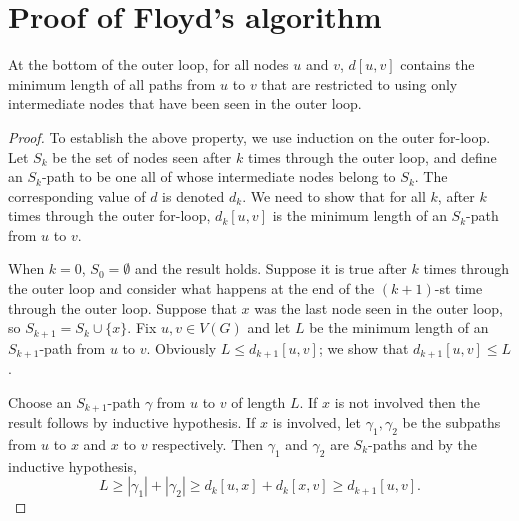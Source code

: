 \section{Proof of Floyd's algorithm}
\begin{Theorem} \label{thm:floyd}
At the bottom of the outer  loop, for all nodes $u$ and $v$,
$d[u,v]$ contains the minimum length of all paths from $u$ to $v$ that
are restricted to using only intermediate nodes that have been seen in
the outer  loop. 
\end{Theorem}


\begin{proof}
To establish the above property, we use induction on the outer for-loop.
Let $S_k$ be the set of nodes seen after $k$ times through the
outer loop, and define an $S_k$-path  to be one all of whose
intermediate nodes belong to $S_k$. The corresponding value of $d$ is 
denoted $d_k$. We need to show that for all $k$, after $k$ times through 
the outer for-loop, $d_k[u,v]$ is the minimum length of an $S_k$-path 
from $u$ to $v$. 

When $k=0$, $S_0 = \emptyset$ and the result holds. Suppose
it is true after $k$ times through the outer loop and consider what
happens at the end of the $(k+1)$-st time through the outer loop.
Suppose that $x$ was the last node seen in the outer loop, so $S_{k+1}=
S_k \cup \{x\}$. Fix $u, v\in V(G)$ and let $L$ be the minimum length of
an $S_{k+1}$-path from $u$ to $v$. Obviously $L \leq d_{k+1}[u,v]$; we
show that $d_{k+1}[u,v] \leq L$. 

Choose an $S_{k+1}$-path $\gamma$ from $u$ to $v$ of length $L$. If $x$
is not involved then the result follows by inductive hypothesis. If $x$
is involved, let $\gamma_1, \gamma_2$ be the subpaths from $u$ to $x$
and $x$ to $v$ respectively. Then $\gamma_1$ and $\gamma_2$ are
$S_k$-paths and by the inductive hypothesis, $$L \geq |\gamma_1| +
|\gamma_2| \geq d_k[u,x] + d_k[x,v] \geq d_{k+1}[u,v]\text{.}$$
\end{proof}


